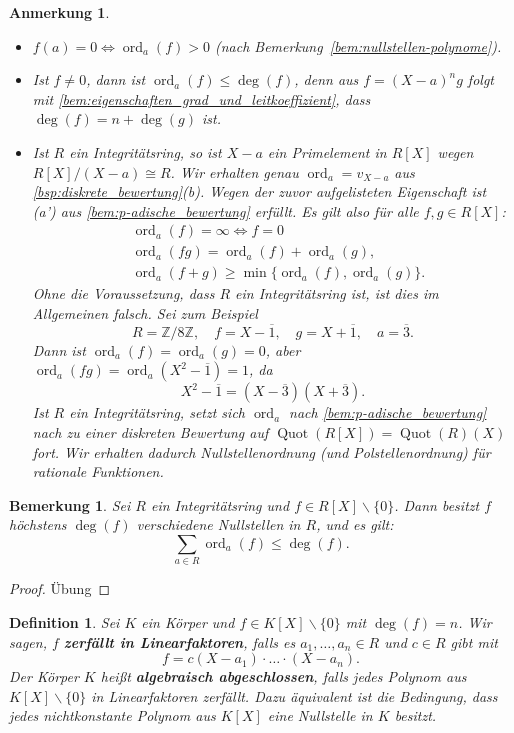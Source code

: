 \documentclass[a4paper, twoside, 11pt, ngerman]{report}
\renewcommand{\setminus}{\smallsetminus}
\DeclareMathOperator{\ord}{ord}
\DeclareMathOperator{\Quot}{Quot}
\theoremstyle{definistyle}
\newtheorem{defini}[satz]{Definition}
\newtheorem{bem}[satz]{Bemerkung}
\newtheorem{anm}[satz]{Anmerkung}
\theoremstyle{remark}
\newcommand{\defn}[1]{\textit{\bfseries #1}}
\begin{document}
\begin{anm}\label{anm:nullstellenordnung}
\begin{itemize}
    \item $f(a) = 0 \iff \operatorname{ord}_a(f) > 0$ (nach Bemerkung~\ref{bem:nullstellen-polynome}).
    \item Ist $f\neq0$, dann ist $\ord_a(f)\leq\deg(f)$, denn aus $f=(X-a)^ng$ folgt
    mit \ref{bem:eigenschaften_grad_und_leitkoeffizient}, dass $\deg(f)=n+\deg (g)$ ist.
    \item Ist $R$ ein Integritätsring, so ist $X-a$ ein Primelement in $R[X]$ wegen
    $R[X]/(X-a)\cong R$. Wir erhalten genau $\ord_a=v_{X-a}$ aus \ref{bsp:diskrete_bewertung}(b). Wegen der zuvor aufgelisteten Eigenschaft ist (a') aus \ref{bem:p-adische_bewertung} erfüllt. Es gilt also für alle $f,g\in R[X]$:
    \begin{align*}
        &\ord_a(f) = \infty \iff f=0 \\
        &\ord_a(fg) = \ord_a(f) + \ord_a(g), \\
        &\ord_a(f + g) \geq \min\{\ord_a(f), \ord_a(g)\}.
    \end{align*}
    Ohne die Voraussetzung, dass $R$ ein Integritätsring ist, ist dies im Allgemeinen falsch. Sei zum Beispiel \[R = \mathbb{Z}/8\mathbb{Z}, \quad f = X - \overline{1}, \quad g = X + \overline{1},\quad a = \overline{3}.\] Dann ist $\operatorname{ord}_a(f) = \operatorname{ord}_a(g) = 0$, aber $\operatorname{ord}_a(fg) = \operatorname{ord}_a(X^2 - \overline{1}) = 1$, da
    \[
    X^2 - \overline{1} = (X - \overline{3})(X + \overline{3}).
    \]
    Ist $R$ ein Integritätsring, setzt sich $\ord_a$ nach \ref{bem:p-adische_bewertung}
    nach zu einer diskreten Bewertung auf $\Quot(R[X])=\Quot(R)(X)$ fort. Wir erhalten dadurch Nullstellenordnung (und Polstellenordnung) für rationale Funktionen.
\end{itemize}
\end{anm}

\begin{bem}\label{bem:summe-nullstellenordnung}
Sei $R$ ein Integritätsring und $f\in R[X]\setminus\{0\}$. Dann besitzt $f$ höchstens $\deg(f)$ verschiedene Nullstellen in $R$, und es gilt:
\[
\sum_{a \in R} \ord_a(f) \leq \deg(f).
\]
\end{bem}
\begin{proof}
Übung
\end{proof}

\begin{defini}\label{def:zerfall_linear}
Sei $K$ ein Körper und $f \in K[X]\setminus\{0\}$ mit $\deg(f) = n$. Wir sagen, $f$ \defn{zerfällt in Linearfaktoren}, falls es $a_1, \dots, a_n \in R$ und $c \in R$ gibt mit
\[
f = c (X - a_1) \cdot\ldots\cdot (X - a_n).
\]
Der Körper $K$ heißt \defn{algebraisch abgeschlossen}, falls jedes Polynom aus $K[X] \setminus \{0\}$ in Linearfaktoren zerfällt. Dazu äquivalent ist die Bedingung, dass 
jedes nichtkonstante Polynom aus $K[X]$ eine Nullstelle in $K$ besitzt. 
\end{defini}
\end{document}

